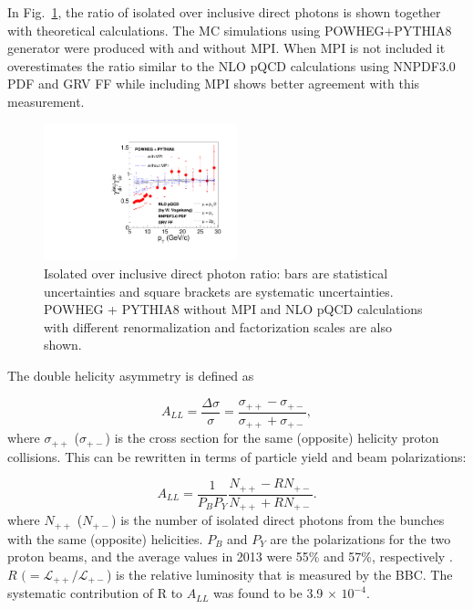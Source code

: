 \documentclass[twocolumn,letterpaper,aps,prl,longbibliography,superscriptaddress,floatfix]{revtex4-2}
\begin{document}
In Fig.~\ref{fig:iso2inc}, the ratio of isolated over inclusive direct photons is shown together with theoretical calculations. The MC simulations using POWHEG+PYTHIA8 generator were produced with and without MPI. When MPI is not included it overestimates the ratio similar to the NLO pQCD calculations using NNPDF3.0 PDF and GRV FF while including MPI shows better agreement with this measurement.

\begin{figure}
\centering
\includegraphics[width=0.5\textwidth]{Iso2Inc}
\caption{Isolated over inclusive direct photon ratio: bars are statistical uncertainties and square brackets are systematic uncertainties. POWHEG + PYTHIA8 without MPI and NLO pQCD calculations with different renormalization and factorization scales are also shown.}
\label{fig:iso2inc}
\end{figure}

The double helicity asymmetry is defined as

\begin{equation} \label{eq:all}
A_{LL} = \frac{\Delta\sigma}{\sigma} = \frac{\sigma_{++}-\sigma_{+-}}{\sigma_{++}+\sigma_{+-}},
\end{equation}
where $\sigma_{++}$ ($\sigma_{+-}$) is the cross section for the same (opposite) helicity proton collisions. This can be rewritten in terms of particle yield and beam polarizations:

\begin{equation}
A_{LL} = \frac{1}{P_BP_Y} \frac{N_{++}-RN_{+-}}{N_{++}+RN_{+-}}.
\end{equation}
where $N_{++}$ ($N_{+-}$) is the number of isolated direct photons from the bunches with the same (opposite) helicities. $P_{B}$ and $P_{Y}$ are the polarizations for the two proton beams, and the average values in 2013 were 55\% and 57\%, respectively \cite{POBLAGUEV2020164261}. $R$ $(= \mathcal{L_{++}}/\mathcal{L_{+-}}$) is the relative luminosity that is measured by the BBC. The systematic contribution of R to $A_{LL}$ was found to be 3.9 $\times$ $10^{-4}$.
\end{document}
